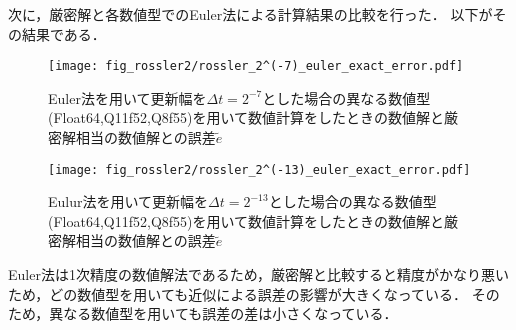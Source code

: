 次に，厳密解と各数値型でのEuler法による計算結果の比較を行った．
以下がその結果である．\\
\begin{figure}[H]
    \centering
    \begin{minipage}[b]{0.48\columnwidth}
        \centering
        \texttt{[image: fig\_rossler2/rossler\_2^(-7)\_euler\_exact\_error.pdf]}
        \caption{Euler法を用いて更新幅を$\Delta t = 2^{-7}$とした場合の異なる数値型(Float64,Q11f52,Q8f55)を用いて数値計算をしたときの数値解と厳密解相当の数値解との誤差$\tilde{e}$}
        \label{fig:rossler_2^(-7)_eluer_exact_error}
    \end{minipage}
    \hspace{0.01\columnwidth}
    \begin{minipage}[b]{0.48\columnwidth}
        \centering
        \texttt{[image: fig\_rossler2/rossler\_2^(-13)\_euler\_exact\_error.pdf]}
        \caption{Eulur法を用いて更新幅を$\Delta t =  2^{-13}$とした場合の異なる数値型(Float64,Q11f52,Q8f55)を用いて数値計算をしたときの数値解と厳密解相当の数値解との誤差$\tilde{e}$}
        \label{fig:rossler_2^(-13)_euler_exact_error}
    \end{minipage}
\end{figure}
Euler法は1次精度の数値解法であるため，厳密解と比較すると精度がかなり悪いため，どの数値型を用いても近似による誤差の影響が大きくなっている．
そのため，異なる数値型を用いても誤差の差は小さくなっている．

